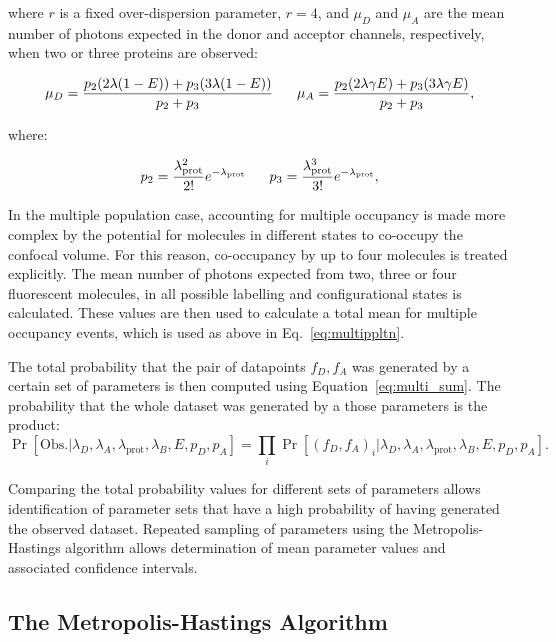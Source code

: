 where $r$ is a fixed over-dispersion parameter, $r = 4$, and $\mu_D$ and $\mu_A$ are the mean number of photons expected in the donor and acceptor channels, respectively, when two or three proteins are observed:

\begin{equation}
\footnotesize
\mu_D = \frac{p_2(2\lambda(1-E)) +p_3(3\lambda(1-E))}{p_2+p_3} \qquad
\mu_A = \frac{p_2(2\lambda \gamma E) +p_3(3\lambda \gamma E)}{p_2+p_3} ,
\end{equation}

where:

\begin{equation}
\footnotesize
p_2 = \frac{\lambda_{\text{prot}}^2}{2!}e^{-\lambda_{\text{prot}}} \qquad
p_3 = \frac{\lambda_{\text{prot}}^3}{3!}e^{-\lambda_{\text{prot}}} ,
\end{equation}

In the multiple population case, accounting for multiple occupancy is made more complex by the potential for molecules in different states to co-occupy the confocal volume. For this reason, co-occupancy by up to four molecules is treated explicitly. The mean number of photons expected from two, three or four fluorescent molecules, in all possible labelling and configurational states is calculated. These values are then used to calculate a total mean for multiple occupancy events, which is used as above in Eq.~\ref{eq:multippltn}. 

The total probability that the pair of datapoints $f_D, f_A$ was generated by a certain set of parameters is then computed using Equation~\ref{eq:multi_sum}. The probability that the whole dataset was generated by a those parameters is the product:
\begin{equation}
\Pr[\text{Obs.}|\lambda_D, \lambda_A, \lambda_{\text{prot}}, \lambda_B, E, p_D, p_A] = \prod_i \Pr[(f_D, f_A)_i |\lambda_D, \lambda_A, \lambda_{\text{prot}}, \lambda_B, E, p_D, p_A].
\end{equation}

Comparing the total probability values for different sets of parameters allows identification of parameter sets that have a high probability of having generated the observed dataset. Repeated sampling of parameters using the Metropolis-Hastings algorithm allows determination of mean parameter values and associated confidence intervals.  

\subsection{The Metropolis-Hastings Algorithm}

